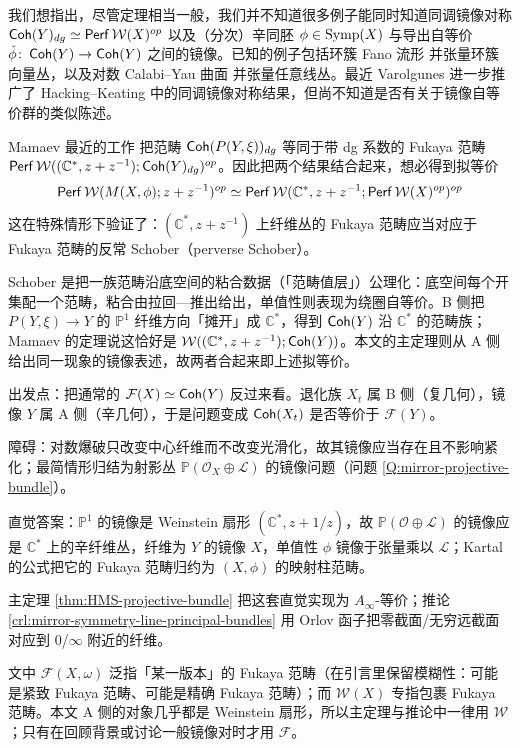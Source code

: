 我们想指出，尽管定理相当一般，我们并不知道很多例子能同时知道同调镜像对称 $\operatorname{\mathsf{Coh}} (Y)_{dg}\simeq\operatorname{\mathsf{Perf}}\mathcal{W} (X)^{op}$ 以及（分次）辛同胚 $\phi\in\operatorname{Symp} (X)$ 与导出自等价 $\check{\phi}\colon\operatorname{\mathsf{Coh}} (Y)\to\operatorname{\mathsf{Coh}} (Y)$ 之间的镜像。已知的例子包括环簇 Fano 流形 \cite{FLTZ12,Abouzaid09,Hanlon19,GPS24M} 并张量环簇向量丛，以及对数 Calabi--Yau 曲面 \cite{HK22,HK25} 并张量任意线丛。最近 Varolgunes \cite{Varolgunes26} 进一步推广了 Hacking--Keating 中的同调镜像对称结果，但尚不知道是否有关于镜像自等价群的类似陈述。

Mamaev 最近的工作 \cite{Mamaev26} 把范畴 $\operatorname{\mathsf{Coh}} (P(Y,\xi))_{dg}$ 等同于带 dg 系数的 Fukaya 范畴 $\operatorname{\mathsf{Perf}}\mathcal{W} ((\mathbb{C}^{\ast},z+z^{-1});\operatorname{\mathsf{Coh}} (Y)_{dg})^{op}$。因此把两个结果结合起来，想必得到拟等价
\[
    \operatorname{\mathsf{Perf}}\mathcal{W} (M(X,\phi);z+z^{-1})^{op}\simeq\operatorname{\mathsf{Perf}}\mathcal{W} (\mathbb{C}^{\ast},z+z^{-1};\operatorname{\mathsf{Perf}}\mathcal{W} (X)^{op})^{op}
\]
这在特殊情形下验证了：$(\mathbb{C}^{\ast}, z+z^{-1})$ 上纤维丛的 Fukaya 范畴应当对应于 Fukaya 范畴的反常 Schober（perverse Schober）。

\begin{yizhu}
Schober 是把一族范畴沿底空间的粘合数据（「范畴值层」）公理化：底空间每个开集配一个范畴，粘合由拉回—推出给出，单值性则表现为绕圈自等价。B 侧把 $P(Y,\xi)\to Y$ 的 $\mathbb{P}^1$ 纤维方向「摊开」成 $\mathbb{C}^{\ast}$，得到 $\operatorname{\mathsf{Coh}}(Y)$ 沿 $\mathbb{C}^{\ast}$ 的范畴族；Mamaev 的定理说这恰好是 $\mathcal{W}((\mathbb{C}^{\ast},z+z^{-1});\operatorname{\mathsf{Coh}}(Y))$。本文的主定理则从 A 侧给出同一现象的镜像表述，故两者合起来即上述拟等价。
\end{yizhu}

\begin{keytakeaways}
  \item 出发点：把通常的 $\mathcal{F}(X)\simeq\operatorname{\mathsf{Coh}}(Y)$ 反过来看。退化族 $X_t$ 属 B 侧（复几何），镜像 $Y$ 属 A 侧（辛几何），于是问题变成 $\operatorname{\mathsf{Coh}}(X_t)$ 是否等价于 $\mathcal{F}(Y)$。
  \item 障碍：对数爆破只改变中心纤维而不改变光滑化，故其镜像应当存在且不影响紧化；最简情形归结为射影丛 $\mathbb{P}(\mathcal{O}_X\oplus\mathcal{L})$ 的镜像问题（问题 \ref{Q:mirror-projective-bundle}）。
  \item 直觉答案：$\mathbb{P}^1$ 的镜像是 Weinstein 扇形 $(\mathbb{C}^{\ast},z+1/z)$，故 $\mathbb{P}(\mathcal{O}\oplus\mathcal{L})$ 的镜像应是 $\mathbb{C}^{\ast}$ 上的辛纤维丛，纤维为 $Y$ 的镜像 $X$，单值性 $\phi$ 镜像于张量乘以 $\mathcal{L}$；Kartal 的公式把它的 Fukaya 范畴归约为 $(X,\phi)$ 的映射柱范畴。
  \item 主定理 \ref{thm:HMS-projective-bundle} 把这套直觉实现为 $A_{\infty}$-等价；推论 \ref{crl:mirror-symmetry-line-principal-bundles} 用 Orlov 函子把零截面/无穷远截面对应到 $0$/$\infty$ 附近的纤维。
\end{keytakeaways}

\begin{yizhu}
文中 $\mathcal{F}(X,\omega)$ 泛指「某一版本」的 Fukaya 范畴（在引言里保留模糊性：可能是紧致 Fukaya 范畴、可能是精确 Fukaya 范畴）；而 $\mathcal{W}(X)$ 专指包裹 Fukaya 范畴。本文 A 侧的对象几乎都是 Weinstein 扇形，所以主定理与推论中一律用 $\mathcal{W}$；只有在回顾背景或讨论一般镜像对时才用 $\mathcal{F}$。
\end{yizhu}
